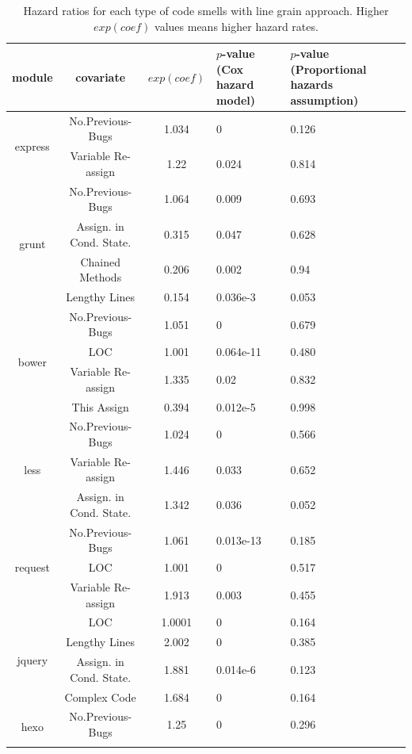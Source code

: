 \begin{table}[!htbp]
	\centering
	\scriptsize
	\caption{Hazard ratios for each type of code smells with line grain approach. Higher $exp(coef)$ values means higher hazard rates.}
	\begin{tabular}{c|c|c|p{2cm}|p{2cm}}
		\hline
		module & covariate & $exp(coef)$ & $p$-value (Cox hazard model) & $p$-value (Proportional hazards assumption) \\ \hline
		\multirow{2}{*}{express}
		& No.Previous-Bugs & 1.034 & 0 & 0.126 \\ \cline{2-5}
		& Variable Re-assign & 1.22 & 0.024 & 0.814  \\ \hline
		\multirow{4}{*}{grunt} 
		& No.Previous-Bugs & 1.064 & 0.009 & 0.693 \\ \cline{2-5}
		& Assign. in Cond. State. & 0.315 & 0.047 & 0.628 \\ \cline{2-5}
		& Chained Methods & 0.206 & 0.002 & 0.94 \\ \cline{2-5}
		& Lengthy Lines & 0.154 & 0.036e-3 & 0.053 \\ \hline
		\multirow{4}{*}{bower}
		& No.Previous-Bugs & 1.051 & 0 & 0.679 \\ \cline{2-5}
		& LOC & 1.001 & 0.064e-11 & 0.480 \\ \cline{2-5}
		& Variable Re-assign & 1.335 & 0.02 & 0.832 \\ \cline{2-5}
		& This Assign & 0.394 & 0.012e-5 & 0.998 \\ \hline
		\multirow{3}{*}{less}
		& No.Previous-Bugs & 1.024 & 0 & 0.566 \\ \cline{2-5}
		& Variable Re-assign & 1.446 & 0.033 & 0.652 \\ \cline{2-5}
		& Assign. in Cond. State. & 1.342 & 0.036 & 0.052 \\ \hline
		\multirow{3}{*}{request}
		& No.Previous-Bugs & 1.061 & 0.013e-13 & 0.185 \\ \cline{2-5}
		& LOC & 1.001 & 0 & 0.517 \\ \cline{2-5}
		& Variable Re-assign & 1.913 & 0.003 & 0.455 \\ \hline
		\multirow{4}{*}{jquery}
		& LOC & 1.0001 & 0 & 0.164 \\ \cline{2-5}
		& Lengthy Lines & 2.002 & 0 & 0.385 \\ \cline{2-5}
		& Assign. in Cond. State. & 1.881 & 0.014e-6 & 0.123 \\ \cline{2-5}
		& Complex Code & 1.684 & 0 & 0.164 \\ \hline
		\multirow{2}{*}{hexo}
		& No.Previous-Bugs & 1.25 & 0 & 0.296 \\ \cline{2-5}

\end{tabular}
\end{table}
